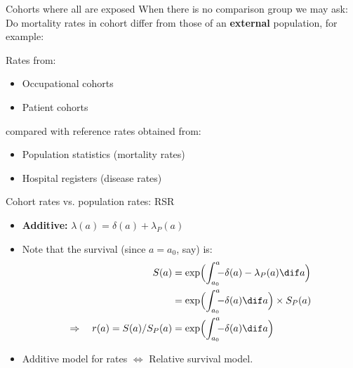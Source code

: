 \begin{frame}{Cohorts where all are exposed}
When there is no comparison group we may ask:\\
Do mortality rates in cohort differ from those of an
\textbf{external} population, for example:

Rates from:
\begin{itemize}
\item Occupational cohorts
\item Patient cohorts
\end{itemize}
compared with reference rates obtained from:
\begin{itemize}
\item Population statistics (mortality rates)
\item Hospital registers (disease rates)
\end{itemize}
\end{frame}

\begin{frame}{Cohort rates vs. population rates: RSR}
  \begin{itemize}
  \item \textbf{Additive:} $\lambda(a) = \delta(a) + \lambda_P(a)$
  \item Note that the survival (since $a=a_0$, say) is: \vspace*{-1ex}
\begin{align*}
     S(a) &= \exp\Bigl(\int_{a_0}^a\!\!\! -\delta(a) - \lambda_P(a) \dif a\Bigr)\\
          &= \exp\Bigl(\int_{a_0}^a\!\!\! -\delta(a) \dif a\Bigr) \times S_P(a)\\
    \Rightarrow \quad
    r(a) = S(a)/S_P(a) &= \exp\Bigl(\int_{a_0}^a\!\!\! -\delta(a) \dif a\Bigr)
  \end{align*}

  \item Additive model for rates $\Leftrightarrow$ Relative survival model.
  \end{itemize}
\end{frame}

